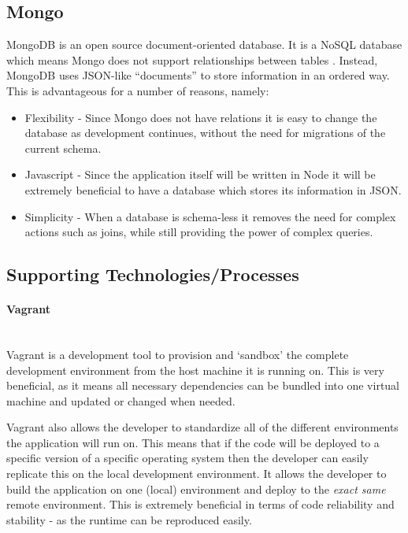 \subsection{Mongo}
MongoDB is an open source document-oriented database. It is a NoSQL database which means Mongo does not support relationships between tables \citep{Mongo216}. Instead, MongoDB uses JSON-like ``documents'' to store information in an ordered way. This is advantageous for a number of reasons, namely:

\begin{itemize}
  \item Flexibility - Since Mongo does not have relations it is easy to change the database as development continues, without the need for migrations of the current schema.
  \item Javascript - Since the application itself will be written in Node it will be extremely beneficial to have a database which stores its information in JSON.
  \item Simplicity - When a database is schema-less it removes the need for complex actions such as joins, while still providing the power of complex queries.
\end{itemize}

\subsection{Supporting Technologies/Processes}
\label{subs:support}
\paragraph{Vagrant}\mbox{}\\
Vagrant is a development tool to provision and `sandbox' the complete development environment from the host machine it is running on. This is very beneficial, as it means all necessary dependencies can be bundled into one virtual machine and updated or changed when needed. 

Vagrant also allows the developer to standardize all of the different environments the application will run on. This means that if the code will be deployed to a specific version of a specific operating system then the developer can easily replicate this on the local development environment. It allows the developer to build the application on one (local) environment and deploy to the \textit{exact same} remote environment. This is extremely beneficial in terms of code reliability and stability - as the runtime can be reproduced easily.
